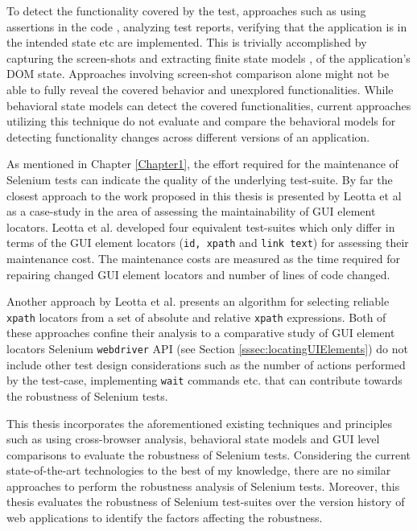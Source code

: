 To detect the functionality covered by the test, approaches such as using assertions in the code \cite{voas1997assertions}, analyzing test reports, verifying that the application is in the intended state etc are implemented. This is trivially accomplished by capturing the screen-shots \cite{GUIdiffBauersfeld} and extracting finite state models \cite{marchettoStateBased}, \cite{SchurMiningBehavModels} of the application's DOM state. Approaches involving screen-shot comparison alone might not be able to fully reveal the covered behavior and unexplored functionalities. While behavioral state models can detect the covered functionalities, current approaches utilizing this technique do not evaluate and compare the behavioral models for detecting functionality changes across different versions of an application. 

As mentioned in Chapter \ref{Chapter1}, the effort required for the maintenance of Selenium tests can indicate the quality of the underlying test-suite. By far the closest approach to the work proposed in this thesis is presented by Leotta et al \cite{leotta2013comparing} as a case-study in the area of assessing the maintainability of GUI element locators. Leotta et al. developed four equivalent test-suites which only differ in terms of the GUI element locators (\texttt{id, xpath} and \texttt{link text}) for assessing their maintenance cost. The maintenance costs are measured as the time required for repairing changed GUI element locators and number of lines of code changed. 

Another approach by Leotta et al. presents an algorithm for selecting reliable \texttt{xpath} locators from a set of absolute and relative \texttt{xpath} expressions. 
Both of these approaches confine their analysis to a comparative study of GUI element locators Selenium \texttt{webdriver} API (see Section \ref{sssec:locatingUIElements}) do not include other test design considerations such as the number of actions performed by the test-case, implementing \texttt{wait} commands etc. that can contribute towards the robustness of Selenium tests. 

This thesis incorporates the aforementioned existing techniques and principles such as using cross-browser analysis, behavioral state models and GUI level comparisons to evaluate the robustness of Selenium tests. Considering the current state-of-the-art technologies to the best of my knowledge, there are no similar approaches to perform the robustness analysis of Selenium tests. Moreover, this thesis evaluates the robustness of Selenium test-suites over the version history of web applications to identify the factors affecting the robustness. 


